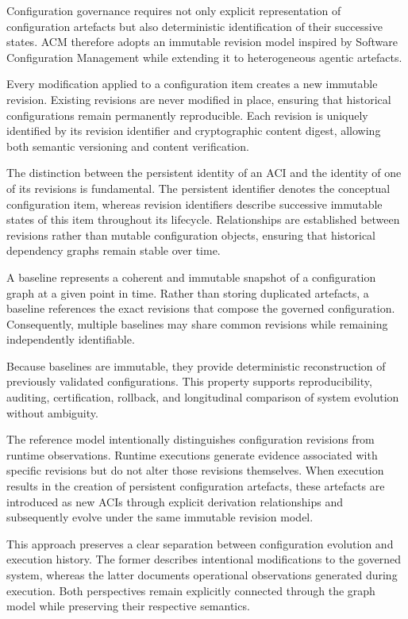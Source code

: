 \documentclass[10pt]{article}
\begin{document}
Configuration governance requires not only explicit representation of configuration artefacts but also deterministic identification of their successive states. ACM therefore adopts an immutable revision model inspired by Software Configuration Management while extending it to heterogeneous agentic artefacts.

Every modification applied to a configuration item creates a new immutable revision. Existing revisions are never modified in place, ensuring that historical configurations remain permanently reproducible. Each revision is uniquely identified by its revision identifier and cryptographic content digest, allowing both semantic versioning and content verification.

The distinction between the persistent identity of an ACI and the identity of one of its revisions is fundamental. The persistent identifier denotes the conceptual configuration item, whereas revision identifiers describe successive immutable states of this item throughout its lifecycle. Relationships are established between revisions rather than mutable configuration objects, ensuring that historical dependency graphs remain stable over time.

A baseline represents a coherent and immutable snapshot of a configuration graph at a given point in time. Rather than storing duplicated artefacts, a baseline references the exact revisions that compose the governed configuration. Consequently, multiple baselines may share common revisions while remaining independently identifiable.

Because baselines are immutable, they provide deterministic reconstruction of previously validated configurations. This property supports reproducibility, auditing, certification, rollback, and longitudinal comparison of system evolution without ambiguity.

The reference model intentionally distinguishes configuration revisions from runtime observations. Runtime executions generate evidence associated with specific revisions but do not alter those revisions themselves. When execution results in the creation of persistent configuration artefacts, these artefacts are introduced as new ACIs through explicit derivation relationships and subsequently evolve under the same immutable revision model.

This approach preserves a clear separation between configuration evolution and execution history. The former describes intentional modifications to the governed system, whereas the latter documents operational observations generated during execution. Both perspectives remain explicitly connected through the graph model while preserving their respective semantics.
\end{document}
